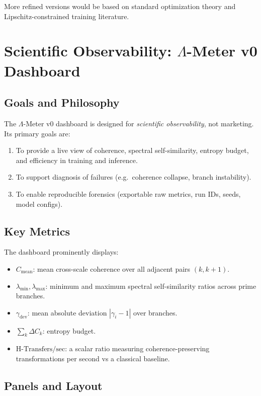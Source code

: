 \documentclass[11pt]{article}
\begin{document}
More refined versions would be based on standard optimization theory and Lipschitz-constrained training literature.

\section{Scientific Observability: \texorpdfstring{$\Lambda$}{Lambda}-Meter v0 Dashboard}

\subsection{Goals and Philosophy}

The $\Lambda$-Meter v0 dashboard is designed for \emph{scientific observability}, not marketing. Its primary goals are:

\begin{enumerate}
  \item To provide a live view of coherence, spectral self-similarity, entropy budget, and efficiency in training and inference.
  \item To support diagnosis of failures (e.g.\ coherence collapse, branch instability).
  \item To enable reproducible forensics (exportable raw metrics, run IDs, seeds, model configs).
\end{enumerate}

\subsection{Key Metrics}

The dashboard prominently displays:

\begin{itemize}
  \item $C_{\text{mean}}$: mean cross-scale coherence over all adjacent pairs $(k,k{+}1)$.
  \item $\lambda_{\min}, \lambda_{\max}$: minimum and maximum spectral self-similarity ratios across prime branches.
  \item $\gamma_{\mathrm{dev}}$: mean absolute deviation $|\gamma_i - 1|$ over branches.
  \item $\sum_k \Delta C_k$: entropy budget.
  \item $\text{H-Transfers/sec}$: a scalar ratio measuring coherence-preserving transformations per second vs a classical baseline.
\end{itemize}

\subsection{Panels and Layout}
\end{document}
